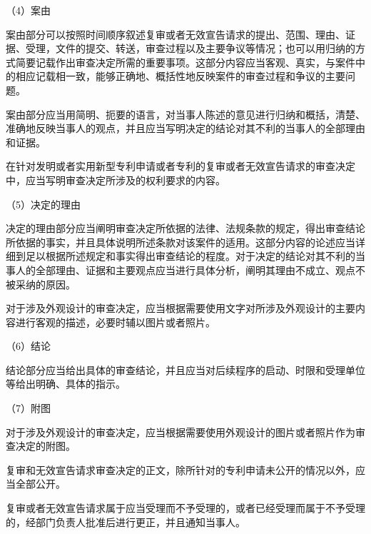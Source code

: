 {\setlength{\parindent}{17.1bp}（4）案由\par}

案由部分可以按照时间顺序叙述复审或者无效宣告请求的提出、范围、理由、证据、受理，文件的提交、转送，审查过程以及主要争议等情况；也可以用归纳的方式简要记载作出审查决定所需的重要事项。这部分内容应当客观、真实，与案件中的相应记载相一致，能够正确地、概括性地反映案件的审查过程和争议的主要问题。

案由部分应当用简明、扼要的语言，对当事人陈述的意见进行归纳和概括，清楚、准确地反映当事人的观点，并且应当写明决定的结论对其不利的当事人的全部理由和证据。

在针对发明或者实用新型专利申请或者专利的复审或者无效宣告请求的审查决定中，应当写明审查决定所涉及的权利要求的内容。

{\setlength{\parindent}{22.2bp}\par}

{\setlength{\parindent}{17.1bp}（5）决定的理由\par}

决定的理由部分应当阐明审查决定所依据的法律、法规条款的规定，得出审查结论所依据的事实，并且具体说明所述条款对该案件的适用。这部分内容的论述应当详细到足以根据所述规定和事实得出审查结论的程度。对于决定的结论对其不利的当事人的全部理由、证据和主要观点应当进行具体分析，阐明其理由不成立、观点不被采纳的原因。

对于涉及外观设计的审查决定，应当根据需要使用文字对所涉及外观设计的主要内容进行客观的描述，必要时辅以图片或者照片。

{\setlength{\parindent}{17.1bp}（6）结论\par}

结论部分应当给出具体的审查结论，并且应当对后续程序的启动、时限和受理单位等给出明确、具体的指示。

{\setlength{\parindent}{17.1bp}（7）附图\par}

对于涉及外观设计的审查决定，应当根据需要使用外观设计的图片或者照片作为审查决定的附图。

复审和无效宣告请求审查决定的正文，除所针对的专利申请未公开的情况以外，应当全部公开。

复审或者无效宣告请求属于应当受理而不予受理的，或者已经受理而属于不予受理的，经部门负责人批准后进行更正，并且通知当事人。

